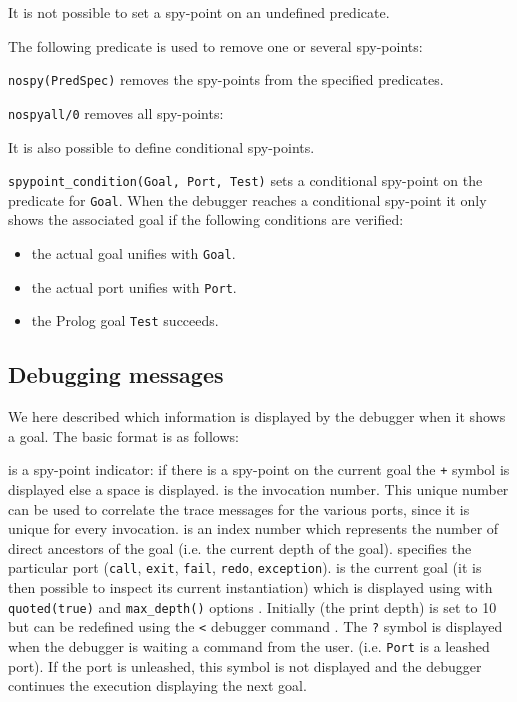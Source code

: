 It is not possible to set a spy-point on an undefined predicate.

The following predicate is used to remove one or several spy-points:

\texttt{nospy(PredSpec)} removes the spy-points from the specified
predicates.

\texttt{nospyall/0} removes all spy-points:

It is also possible to define conditional spy-points.

\texttt{spypoint\_condition(Goal, Port, Test)} sets a
conditional spy-point on the predicate for \texttt{Goal}. When the debugger
reaches a conditional spy-point it only shows the associated goal if the
following conditions are verified:

\begin{itemize}

\item the actual goal unifies with \texttt{Goal}.

\item the actual port unifies with \texttt{Port}.

\item the Prolog goal \texttt{Test} succeeds.

\end{itemize}

\subsection{Debugging messages}
We here described which information is displayed by the debugger when it
shows a goal. The basic format is as follows:


 is a spy-point indicator: if there is a spy-point on the
current goal the \texttt{+} symbol is displayed else a space is displayed.
 is the invocation number. This unique number can be used
to correlate the trace messages for the various ports, since it is unique
for every invocation.  is an index number which
represents the number of direct ancestors of the goal (i.e. the current
depth of the goal).  specifies the particular port
(\texttt{call}, \texttt{exit}, \texttt{fail}, \texttt{redo},
\texttt{exception}).  is the current goal (it is then
possible to inspect its current instantiation) which is displayed using
 with \texttt{quoted(true)} and
\texttt{max\_depth()} options . Initially
 (the print depth) is set to 10 but can be redefined
using the \texttt{<} debugger command . The
\texttt{?} symbol is displayed when the debugger is waiting a command from
the user. (i.e. \texttt{Port} is a leashed port). If the port is unleashed,
this symbol is not displayed and the debugger continues the execution
displaying the next goal.

